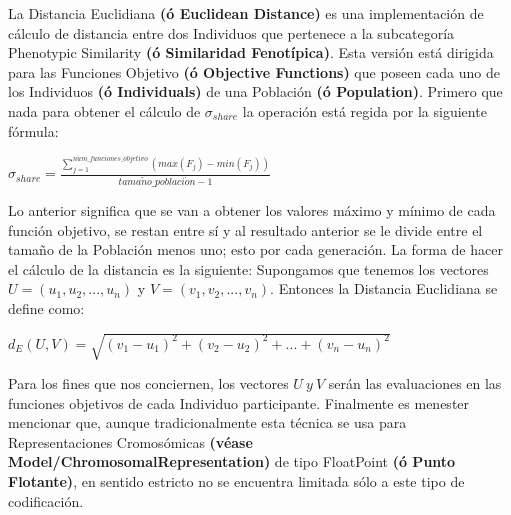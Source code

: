 \documentclass[class=report, crop=false]{standalone}
\begin{document}
\begin{fulllineitems}

\begin{DUlineblock}{0em}
\item[] La Distancia Euclidiana \textbf{(ó Euclidean Distance)} es una 
implementación de cálculo de distancia entre dos Individuos 
que pertenece a la subcategoría Phenotypic Similarity \textbf{(ó Similaridad Fenotípica)}.\break
Esta versión está dirigida para las Funciones Objetivo 
\textbf{(ó Objective Functions)} que poseen cada uno de los 
Individuos \textbf{(ó Individuals)} de una Población \textbf{(ó Population)}.\medskip\break
Primero que nada para obtener el cálculo de \(\sigma_{share}\) 
la operación está regida por la siguiente fórmula:

\begin{center}\(\sigma_{share} = \frac{\sum_{j=1}^{n\acute{u}m\_funciones\_objetivo}(max(F_j) - min(F_j))}{tama\tilde{n}o\_poblaci\acute{o}n - 1}\)
\end{center}

Lo anterior significa que se van a obtener los valores máximo y 
mínimo de cada función objetivo, se restan entre sí y al resultado 
anterior se le divide entre el tamaño de la Población menos uno; 
esto por cada generación.\break
La forma de hacer el cálculo de la distancia es la siguiente:\break
Supongamos que tenemos los vectores \(U = (u_1,u_2,...,u_n)\) y \(V = (v_1,v_2,...,v_n)\). 
Entonces la Distancia Euclidiana se define como:

\begin{center}\(d_E(U,V) = \sqrt{(v_1 - u_1)^2 + (v_2 - u_2)^2 + ... + (v_n - u_n)^2}\)
\end{center}

Para los fines que nos conciernen, los vectores \(U\ y\ V\) serán las 
evaluaciones en las funciones objetivos de cada Individuo participante.\break
Finalmente es menester mencionar que, aunque tradicionalmente esta 
técnica se usa para Representaciones Cromosómicas \textbf{(véase Model/ChromosomalRepresentation)} 
de tipo FloatPoint \textbf{(ó Punto Flotante)}, en sentido estricto no 
se encuentra limitada sólo a este tipo de codificación.
\end{DUlineblock}

\end{fulllineitems}

\end{document}
